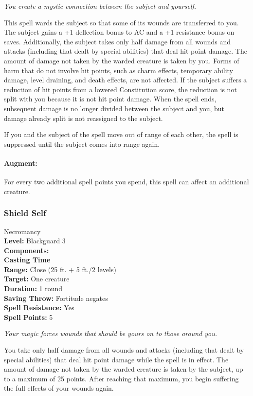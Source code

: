 \emph{You create a mystic connection between the subject and yourself.}

This spell wards the subject so that some of its wounds are transferred to you. 
The subject gains a +1 deflection bonus to AC and a +1 resistance bonus on saves. 
Additionally, the subject takes only half damage from all wounds and attacks (including that dealt by special abilities) that deal hit point damage. 
The amount of damage not taken by the warded creature is taken by you. 
Forms of harm that do not involve hit points, such as charm effects, temporary ability damage, level draining, and death effects, are not affected. 
If the subject suffers a reduction of hit points from a lowered Constitution score, 
the reduction is not split with you because it is not hit point damage. 
When the spell ends, subsequent damage is no longer divided between the subject and you, but damage already split is not reassigned to the subject.

If you and the subject of the spell move out of range of each other, the spell is suppressed until the subject comes into range again.

\paragraph{Augment:} For every two additional spell points you spend, this spell can affect an additional creature.
\subsubsection{Shield Self}
\label{Spell:ShieldSelf}
Necromancy
\\ \textbf{Level:} Blackguard 3
\\ \textbf{Components:} 
\\ \textbf{Casting Time}
\\ \textbf{Range:} Close (25 ft. + 5 ft./2 levels)
\\ \textbf{Target:} One creature
\\ \textbf{Duration:} 1 round
\\ \textbf{Saving Throw:} Fortitude negates
\\ \textbf{Spell Resistance:} Yes
\\ \textbf{Spell Points:} 5

\emph{Your magic forces wounds that should be yours on to those around you.}

You take only half damage from all wounds and attacks (including that dealt by special abilities) that deal hit point damage while the spell is in effect. The amount of damage not taken by the warded creature is taken by the subject, up to a maximum of 25 points. After reaching that maximum, you begin suffering the full effects of your wounds again.
 
